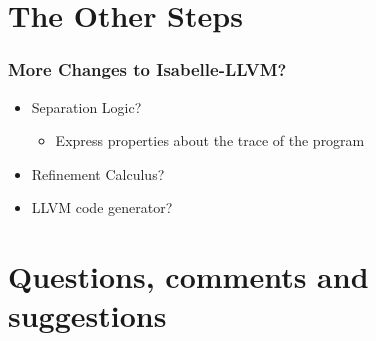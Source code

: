 \documentclass[aspectratio=169,10pt]{beamer}
\begin{document}
\section{The Other Steps}
\begin{frame}[fragile]
  \frametitle{More Changes to Isabelle-LLVM?}
  \begin{itemize}
    \item Separation Logic?
          \begin{itemize}
            \item Express properties about the trace of the program
          \end{itemize}
    \item Refinement Calculus?
    \item LLVM code generator?
  \end{itemize}
\end{frame}

\section{Questions, comments and suggestions}
\end{document}
